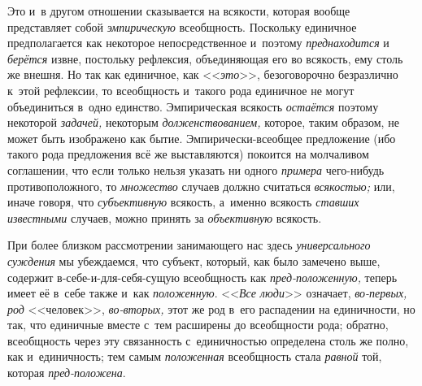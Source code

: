 \label{bkm:bm38a}Это и~в другом отношении сказывается на всякости, которая
вообще представляет собой {\em эмпирическую} всеобщность. Поскольку единичное
предполагается как некоторое непосредственное и~поэтому {\em преднаходится} и
{\em берётся} извне, постольку рефлексия, объединяющая его во всякость, ему
столь же внешня. Но так как единичное, как <<{\em это}>>, безоговорочно
безразлично к~этой рефлексии, то всеобщность и~такого рода единичное не могут
объединиться в~одно единство. Эмпирическая всякость {\em остаётся} поэтому
некоторой {\em задачей,} некоторым {\em долженствованием,} которое, таким
образом, не может быть изображено как бытие. Эмпирически-всеобщее предложение
(ибо такого рода предложения всё же выставляются) покоится на молчаливом
соглашении, что если только нельзя указать ни одного {\em примера} чего-нибудь
противоположного, то {\em множество} случаев должно считаться {\em всякостью;}
или, иначе говоря, что {\em субъективную} всякость, а~именно всякость
{\em ставших известными} случаев, можно принять за {\em объективную} всякость.

При более близком рассмотрении занимающего нас здесь {\em универсального
суждения} мы убеждаемся, что субъект, который, как было замечено выше, содержит
в-себе-и-для-себя-сущую всеобщность как {\em пред-положенную,} теперь имеет её
в~себе также и~как {\em положенную}. <<{\em Все люди}>> означает,
{\em во-первых, род} <<человек>>, {\em во-вторых,} этот же род в~его
распадении на единичности, но так, что единичные вместе с~тем расширены до
всеобщности рода; обратно, всеобщность через эту связанность с~единичностью
определена столь же полно, как и~единичность; тем самым {\em положенная}
всеобщность стала {\em равной} той, которая {\em пред-положена}.

